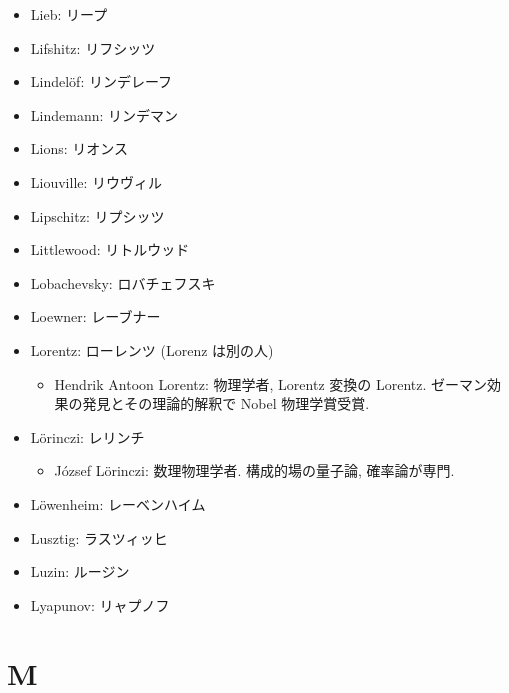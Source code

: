 \documentclass[openany, a4paper, oneside]{jsbook}
\begin{document}
\begin{itemize}
\item Lieb: リープ
\item Lifshitz: リフシッツ
\item Lindel\"of: リンデレーフ
\item Lindemann: リンデマン
\item Lions: リオンス
\item Liouville: リウヴィル
\item Lipschitz: リプシッツ
\item Littlewood: リトルウッド
\item Lobachevsky: ロバチェフスキ
\item Loewner: レーブナー
\item Lorentz: ローレンツ (Lorenz は別の人)
\begin{itemize}
\item Hendrik Antoon Lorentz: 物理学者, Lorentz 変換の Lorentz. ゼーマン効果の発見とその理論的解釈で Nobel 物理学賞受賞.
\end{itemize}
\item L\"orinczi: レリンチ
\begin{itemize}
\item J\'ozsef L\"orinczi: 数理物理学者. 構成的場の量子論, 確率論が専門.
\end{itemize}
\item L\"owenheim: レーベンハイム
\item Lusztig: ラスツィッヒ
\item Luzin: ルージン
\item Lyapunov: リャプノフ
\end{itemize}
\section{M}
\end{document}
